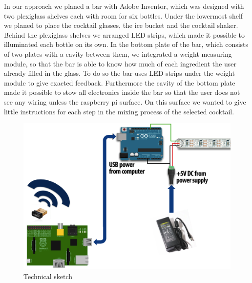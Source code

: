 \documentclass{acm_proc_article-sp}
\begin{document}
\begin{minipage}{\linewidth}%
\label{fig:bar_inventor}%
\end{minipage}

In our approach we planed a bar with Adobe Inventor, which was designed with two plexiglass shelves each with room for six bottles. Under the lowermost shelf we planed to place the cocktail glasses, the ice bucket and the cocktail shaker. Behind the plexiglass shelves we arranged LED strips, which made it possible to illuminated each bottle on its own.
In the bottom plate of the bar, which consists of two plates with a cavity between them, we integrated a weight measuring module, so that the bar is able to know how much of each ingredient the user already filled in the glass. To do so the bar uses LED strips under the weight module to give exacted feedback.  
Furthermore the cavity of the bottom plate made it possible to stow all electronics inside the bar so that the user does not see any wiring unless the raspberry pi surface. On this surface we wanted to give little instructions for each step in the mixing process of the selected cocktail.

\begin{figure}[htbp] 
  \centering
     \includegraphics[width=0.7\linewidth]{pictures/technical.png}
  \caption{Technical sketch}
  \label{fig:technical}
\end{figure}
\end{document}
